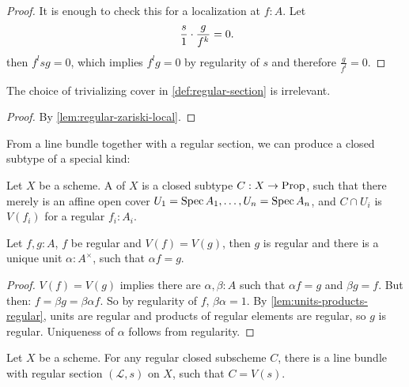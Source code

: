 \begin{proof}
  It is enough to check this for a localization at $f:A$.
  Let
  \[ \frac{s}{1}\cdot\frac{g}{f^k}=0\rlap{.} \]
  then $f^lsg=0$, which implies $f^lg=0$ by regularity of $s$ and therefore $\frac{g}{f^l}=0$.
\end{proof}

\begin{proposition}%
  The choice of trivializing cover in \cref{def:regular-section}
  is irrelevant.
\end{proposition}

\begin{proof}
  By \cref{lem:regular-zariski-local}.
\end{proof}

From a line bundle together with a regular section,
we can produce a closed subtype of a special kind:

\begin{definition}%
  Let $X$ be a scheme.
  A  of $X$ is a closed subtype
  $C:X\to \mathrm{Prop}$, such that there merely is an affine open cover $U_1=\operatorname{Spec} A_1,\dots,U_n=\operatorname{Spec} A_n$,
  and $C\cap U_i$ is $V(f_i)$ for a regular $f_i:A_i$.
\end{definition}

\begin{lemma}%
  Let $f,g:A$, $f$ be regular and $V(f)=V(g)$,
  then $g$ is regular and there is a unique unit $\alpha:A^\times$, such that $\alpha f=g$.
\end{lemma}

\begin{proof}
  $V(f)=V(g)$ implies there are $\alpha,\beta:A$ such that
  $\alpha f = g$ and $\beta g = f$.
  But then: $f=\beta g=\beta\alpha f$.
  So by regularity of $f$, $\beta\alpha=1$.
  By \cref{lem:units-products-regular}, units are regular and products of regular elements are regular,
  so $g$ is regular.
  Uniqueness of $\alpha$ follows from regularity.
\end{proof}

\begin{theorem}%
  Let $X$ be a scheme.
  For any regular closed subscheme $C$,
  there is a line bundle with regular section $(\mathcal L,s)$ on $X$,
  such that $C=V(s)$.
\end{theorem}

